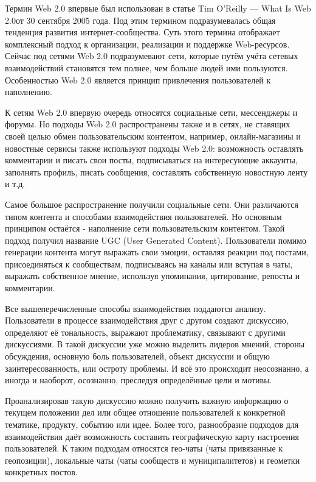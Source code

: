 \documentclass[a4paper,article,14pt]{extarticle}
\begin{document}


\tableofcontents
\pagebreak


	Термин Web 2.0 впервые был использован в статье \flqq Tim O’Reilly — What Is Web 2.0\frqq от 30 сентября 2005 года. Под этим термином подразумевалась общая тенденция развития интернет-сообщества. Суть этого термина отображает комплексный подход к организации, реализации и поддержке Web-ресурсов. Сейчас под сетями Web 2.0 подразумевают сети, которые путём учёта сетевых взаимодействий становятся тем полнее, чем больше людей ими пользуются. Особенностью Web 2.0 является принцип привлечения пользователей к наполнению.

	К сетям Web 2.0 впервую очередь относятся социальные сети, мессенджеры и форумы. Но подходы Web 2.0 распространены также и в сетях, не ставящих своей целью обмен пользовательским контентом, например, онлайн-магазины и новостные сервисы также используют подходы Web 2.0: возможность оставлять комментарии и писать свои посты, подписываться на интересующие аккаунты, заполнять профиль, писать сообщения, составлять собственную новостную ленту и т.д.

	Самое большое распространение получили социальные сети. Они различаются типом контента и способами взаимодействия пользователей. Но основным принципом остаётся - наполнение сети пользовательским контентом. Такой подход получил название UGC (User Generated Content). Пользователи помимо генерации контента могут выражать свои эмоции, оставляя реакции под постами, присоединяться к сообществам, подписываясь на каналы или вступая в чаты, выражать собственное мнение, используя упоминания, цитирование, репосты и комментарии.

	Все вышеперечисленные способы взаимодействия поддаются анализу. Пользователи в процессе взаимодействия друг с другом создают дискуссию, определяют её тональность, выражают проблематику, связывают с другими дискуссиями. В такой дискуссии уже можно выделить лидеров мнений, стороны обсуждения, основную боль пользователей, объект дискуссии и общую заинтересованность, или остроту проблемы. И всё это происходит неосознанно, а иногда и наоборот, осознанно, преследуя определённые цели и мотивы.

	Проанализировав такую дискуссию можно получить важную информацию о текущем положении дел или общее отношение пользователей к конкретной тематике, продукту, событию или идее. Более того, разнообразие подходов для взаимодействия даёт возможность составить географическую карту настроения пользователей. К таким подходам относятся гео-чаты (чаты привязанные к геопозиции), локальные чаты (чаты сообществ и муниципалитетов) и геометки конкретных постов.
\end{document}

